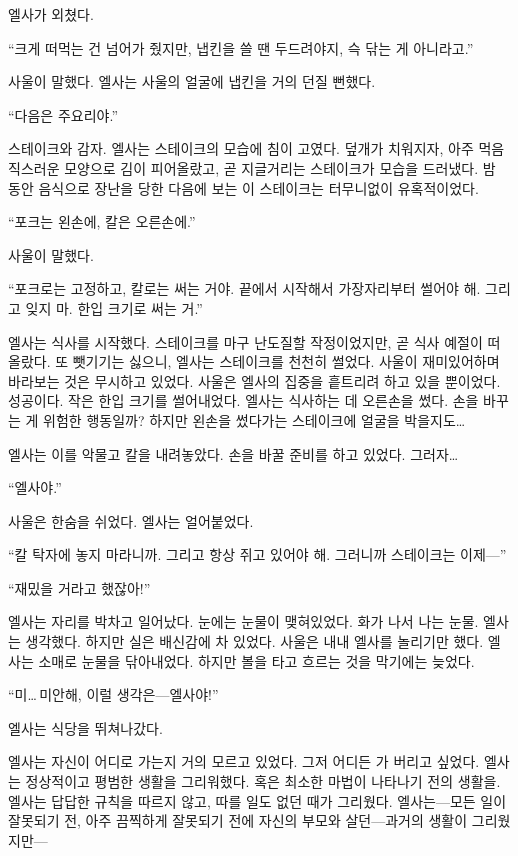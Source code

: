 엘사가 외쳤다.

``크게 떠먹는 건 넘어가 줬지만, 냅킨을 쓸 땐 두드려야지, 슥 닦는 게 아니라고.''

사울이 말했다. 엘사는 사울의 얼굴에 냅킨을 거의 던질 뻔했다.

``다음은 주요리야.''

스테이크와 감자. 엘사는 스테이크의 모습에 침이 고였다. 덮개가 치워지자, 아주 먹음직스러운 모양으로 김이 피어올랐고, 곧 지글거리는 스테이크가 모습을 드러냈다. 밤 동안 음식으로 장난을 당한 다음에 보는 이 스테이크는 터무니없이 유혹적이었다.

``포크는 왼손에, 칼은 오른손에.''

사울이 말했다.

``포크로는 고정하고, 칼로는 써는 거야. 끝에서 시작해서 가장자리부터 썰어야 해. 그리고 잊지 마. 한입 크기로 써는 거.''

엘사는 식사를 시작했다. 스테이크를 마구 난도질할 작정이었지만, 곧 식사 예절이 떠올랐다. 또 뺏기기는 싫으니, 엘사는 스테이크를 천천히 썰었다. 사울이 재미있어하며 바라보는 것은 무시하고 있었다. 사울은 엘사의 집중을 흩트리려 하고 있을 뿐이었다. 성공이다. 작은 한입 크기를 썰어내었다. 엘사는 식사하는 데 오른손을 썼다. 손을 바꾸는 게 위험한 행동일까? 하지만 왼손을 썼다가는 스테이크에 얼굴을 박을지도\ldots

엘사는 이를 악물고 칼을 내려놓았다. 손을 바꿀 준비를 하고 있었다. 그러자\ldots

``엘사야.''

사울은 한숨을 쉬었다. 엘사는 얼어붙었다.

``칼 탁자에 놓지 마라니까. 그리고 항상 쥐고 있어야 해. 그러니까 스테이크는 이제—''

``재밌을 거라고 했잖아!''

엘사는 자리를 박차고 일어났다. 눈에는 눈물이 맺혀있었다. 화가 나서 나는 눈물. 엘사는 생각했다. 하지만 실은 배신감에 차 있었다. 사울은 내내 엘사를 놀리기만 했다. 엘사는 소매로 눈물을 닦아내었다. 하지만 볼을 타고 흐르는 것을 막기에는 늦었다.

``미\ldots\,미안해, 이럴 생각은—엘사야!''

엘사는 식당을 뛰쳐나갔다.

엘사는 자신이 어디로 가는지 거의 모르고 있었다. 그저 어디든 가 버리고 싶었다. 엘사는 정상적이고 평범한 생활을 그리워했다. 혹은 최소한 마법이 나타나기 전의 생활을. 엘사는 답답한 규칙을 따르지 않고, 따를 일도 없던 때가 그리웠다. 엘사는—모든 일이 잘못되기 전, 아주 끔찍하게 잘못되기 전에 자신의 부모와 살던—과거의 생활이 그리웠지만—

